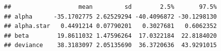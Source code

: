 \documentclass[]{article}
\newenvironment{Shaded}{\begin{snugshade}}{\end{snugshade}}
\newcommand{\DecValTok}[1]{\textcolor[rgb]{0.00,0.00,0.81}{#1}}
\newcommand{\KeywordTok}[1]{\textcolor[rgb]{0.13,0.29,0.53}{\textbf{#1}}}
\newcommand{\NormalTok}[1]{#1}
\newcommand{\OperatorTok}[1]{\textcolor[rgb]{0.81,0.36,0.00}{\textbf{#1}}}
\begin{document}
\begin{Shaded}
\end{Shaded}

\begin{verbatim}
##                   mean         sd        2.5%       97.5%
## alpha      -35.1702775 2.62529294 -40.4096872 -30.1298130
## alpha.star   0.4491214 0.07790201   0.3027681   0.6062352
## beta        19.8611032 1.47596264  17.0322184  22.8184020
## deviance    38.3183097 2.05135690  36.3720636  43.9291015
\end{verbatim}
\end{document}
